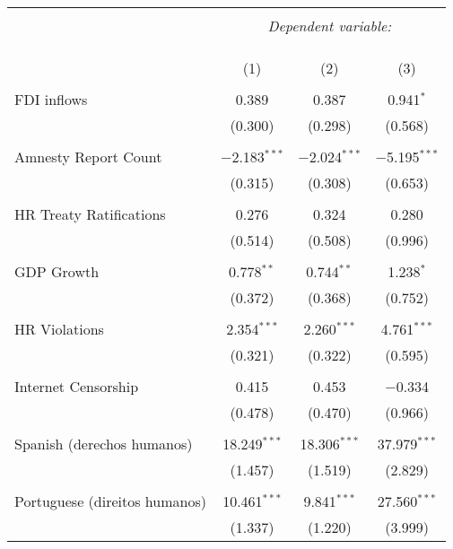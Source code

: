 
\begin{table}[!htbp] \centering 
  \caption{} 
  \label{} 
\begin{tabular}{@{\extracolsep{5pt}}lccc} 
\\[-1.8ex]\hline 
\hline \\[-1.8ex] 
 & \multicolumn{3}{c}{\textit{Dependent variable:}} \\ 
\cline{2-4} 
\\[-1.8ex] & \multicolumn{3}{c}{ } \\ 
\\[-1.8ex] & (1) & (2) & (3)\\ 
\hline \\[-1.8ex] 
 FDI inflows & 0.389 & 0.387 & 0.941$^{*}$ \\ 
  & (0.300) & (0.298) & (0.568) \\ 
  & & & \\ 
 Amnesty Report Count & $-$2.183$^{***}$ & $-$2.024$^{***}$ & $-$5.195$^{***}$ \\ 
  & (0.315) & (0.308) & (0.653) \\ 
  & & & \\ 
 HR Treaty Ratifications & 0.276 & 0.324 & 0.280 \\ 
  & (0.514) & (0.508) & (0.996) \\ 
  & & & \\ 
 GDP Growth & 0.778$^{**}$ & 0.744$^{**}$ & 1.238$^{*}$ \\ 
  & (0.372) & (0.368) & (0.752) \\ 
  & & & \\ 
 HR Violations & 2.354$^{***}$ & 2.260$^{***}$ & 4.761$^{***}$ \\ 
  & (0.321) & (0.322) & (0.595) \\ 
  & & & \\ 
 Internet Censorship & 0.415 & 0.453 & $-$0.334 \\ 
  & (0.478) & (0.470) & (0.966) \\ 
  & & & \\ 
 Spanish (derechos humanos) & 18.249$^{***}$ & 18.306$^{***}$ & 37.979$^{***}$ \\ 
  & (1.457) & (1.519) & (2.829) \\ 
  & & & \\ 
 Portuguese (direitos humanos) & 10.461$^{***}$ & 9.841$^{***}$ & 27.560$^{***}$ \\ 
  & (1.337) & (1.220) & (3.999) \\ 

\end{tabular}
\end{table}
